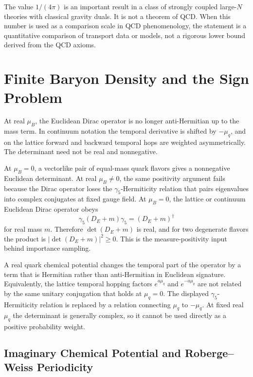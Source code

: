 \begin{remark}
The value \(1/(4\pi)\) is an important result in a class of strongly coupled
large-\(N\) theories with classical gravity duals.  It is not a theorem of
QCD.  When this number is used as a comparison scale in QCD phenomenology,
the statement is a quantitative comparison of transport data or models, not
a rigorous lower bound derived from the QCD axioms.
\end{remark}

\section{Finite Baryon Density and the Sign Problem}

At real \(\mu_B\), the Euclidean Dirac operator is no longer anti-Hermitian
up to the mass term.  In continuum notation the temporal derivative is
shifted by \(-\mu_q\), and on the lattice forward and backward temporal hops
are weighted asymmetrically.  The determinant need not be real and
nonnegative.

At \(\mu_B=0\), a vectorlike pair of equal-mass quark flavors gives a
nonnegative Euclidean determinant.  At real \(\mu_B\ne0\), the same
positivity argument fails because the Dirac operator loses the
\(\gamma_5\)-Hermiticity relation that pairs eigenvalues into complex
conjugates at fixed gauge field.
At \(\mu_B=0\), the lattice or continuum Euclidean Dirac operator obeys
\[
  \gamma_5(D_E+m)\gamma_5=(D_E+m)^\dagger
\]
for real mass \(m\).  Therefore
\(\det(D_E+m)\) is real, and for two degenerate flavors the product is
\(|\det(D_E+m)|^2\ge0\).  This is the measure-positivity input behind
importance sampling.

A real quark chemical potential changes the temporal part of the operator by
a term that is Hermitian rather than anti-Hermitian in Euclidean signature.
Equivalently, the lattice temporal hopping factors \(e^{a\mu_q}\) and
\(e^{-a\mu_q}\) are not related by the same unitary conjugation that holds at
\(\mu_q=0\).  The displayed \(\gamma_5\)-Hermiticity relation is replaced by
a relation connecting \(\mu_q\) to \(-\mu_q\).  At fixed real \(\mu_q\) the
determinant is generally complex, so it cannot be used directly as a
positive probability weight.

\subsection{Imaginary Chemical Potential and Roberge--Weiss Periodicity}
\label{subsec:qcd-imaginary-mu-roberge-weiss}

